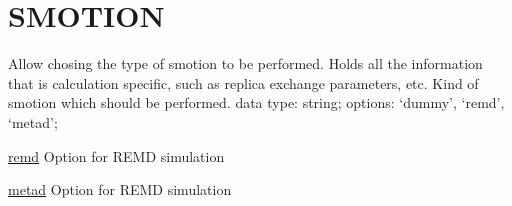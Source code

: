 \section{SMOTION}
\label{SMOTION}
\begin{ipifield}{}%
{Allow chosing the type of smotion to be performed. Holds all the information that is calculation specific, such as replica exchange parameters, etc.}%
{}%
{%
{Kind of smotion which should be performed.}%
{data type: string; options: `dummy', `remd', `metad'; }%
}
\begin{ipifield}{\hyperref[REMD]{remd}}%
{Option for REMD simulation}%
{}%
{}
\end{ipifield}
\begin{ipifield}{\hyperref[META]{metad}}%
{Option for REMD simulation}%
{}%
{}
\end{ipifield}
\end{ipifield}
